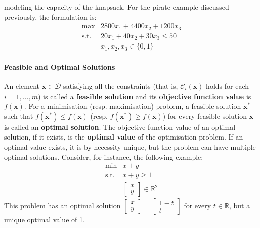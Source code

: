modeling the capacity of the knapsack. For the pirate example discussed previously, the formulation is: \[\begin{array}{rl}
\max & 2800 x_1 + 4400 x_2 + 1200 x_3 \\
\mbox{s.t.} & 20 x_1 + 40 x_2 + 30 x_3 \leq 50\\
 & x_1, x_2, x_3 \in \{0,1\}
\end{array}\]
\paragraph{Feasible and Optimal Solutions} An element \(\mathbf{x} \in \mathcal{D}\) satisfying all the constraints
(that is, \(\mathcal{C}_i(\mathbf{x})\) holds for each
\(i = 1,\ldots,m\)) is called a \textbf{feasible solution} and its
\textbf{objective function value} is \(f(\mathbf{x})\). For a minimisation (resp. maximisation) problem, a feasible solution
\(\mathbf{x}^*\) such that \(f(\mathbf{x}^*) \leq f(\mathbf{x})\)
(resp. \(f(\mathbf{x}^*) \geq f(\mathbf{x})\)) for every feasible solution
\(\mathbf{x}\) is called an \textbf{optimal solution}. The objective function value of an optimal solution, if it
exists, is the \textbf{optimal value} of the optimisation problem. \newl If an optimal value exists, it is by necessity unique, but the problem can have
multiple optimal solutions. Consider, for instance, the following example:
\[\begin{array}{rl}
\min & x+y \\
\mbox{s.t.} 
  & x+y \geq 1 \\
  & \begin{bmatrix} x \\ y \end{bmatrix} \in \mathbb{R}^2
\end{array}\] This problem has an optimal solution 
\(\begin{bmatrix} x \\ y \end{bmatrix} = \begin{bmatrix} 1-t \\ t \end{bmatrix}\)
 for every \(t \in \mathbb{R}\), but a unique optimal
value of 1.

